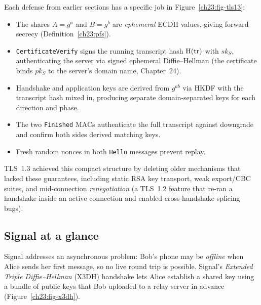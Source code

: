Each defense from earlier sections has a specific job in Figure~\ref{ch23:fig-tls13}:
\begin{itemize}
  \item The shares $A=g^a$ and $B=g^b$ are \emph{ephemeral} ECDH values, giving
        forward secrecy (Definition~\ref{ch23:pfs}).
  \item \texttt{CertificateVerify} signs the running transcript hash $\operatorname{H}(\mathrm{tr})$
        with $sk_S$, authenticating the server via signed ephemeral
        Diffie--Hellman (the certificate binds $pk_S$ to the server's domain
        name, Chapter~24).
  \item Handshake and application keys are derived from $g^{ab}$ via HKDF with
        the transcript hash mixed in, producing separate domain-separated keys
        for each direction and phase.
  \item The two \texttt{Finished} MACs authenticate the full transcript against
        downgrade and confirm both sides derived matching keys.
  \item Fresh random nonces in both \texttt{Hello} messages prevent replay.
\end{itemize}
TLS~1.3 achieved this compact structure by deleting older mechanisms that lacked
these guarantees, including static RSA key transport, weak export/CBC suites,
and mid-connection \emph{renegotiation} (a TLS~1.2 feature that re-ran a
handshake inside an active connection and enabled cross-handshake splicing bugs).

\subsection{Signal at a glance}

Signal addresses an asynchronous problem: Bob's phone may be \emph{offline} when
Alice sends her first message, so no live round trip is possible. Signal's
\emph{Extended Triple Diffie--Hellman} (X3DH) handshake lets Alice establish a
shared key using a bundle of public keys that Bob uploaded to a relay server in
advance (Figure~\ref{ch23:fig-x3dh}).

